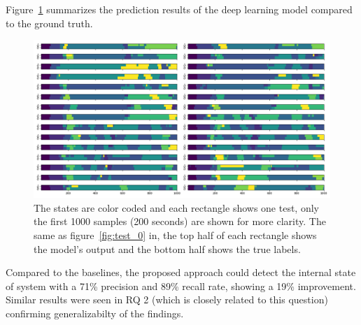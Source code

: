 Figure~\ref{fig:paparazzi_predictions} summarizes the prediction results of the deep learning model compared to the ground truth. 
\begin{figure}
    \centering
    \includegraphics[width=\columnwidth]{RQ3-5_charts/states_chart.png}
    \caption{The states are color coded and each rectangle shows one test, only the first 1000 samples (200 seconds) are shown for more clarity. The same as figure~\ref{fig:test_0} in, the top half of each rectangle shows the model's output and the bottom half shows the true labels.}
    \label{fig:paparazzi_predictions}
\end{figure}


\begin{rqanswer}
Compared to the baselines, the proposed approach could detect the internal state of system with a 71\% precision and 89\% recall rate, showing a 19\% improvement. Similar results were seen in RQ 2 (which is closely related to this question) confirming generalizabilty of the findings.
\end{rqanswer}


